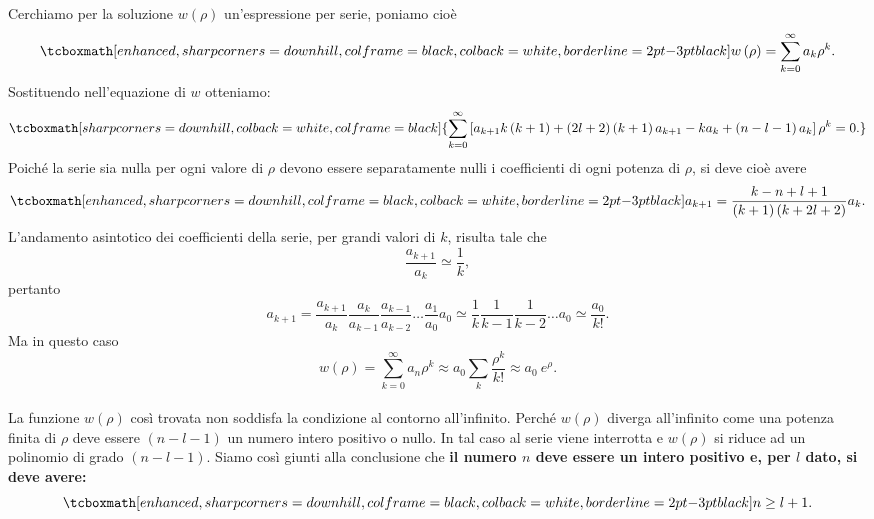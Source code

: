 Cerchiamo per la soluzione $w\left(\rho\right)$ un'espressione per serie, poniamo cioè 
	\begin{equation}
		\tcboxmath[enhanced, sharp corners=downhill, colframe=black, colback=white, borderline={2pt}{-3pt}{black}]{
			w\left(\rho\right)=\sum_{k=0}^\infty a_k \rho^k .
			}
	\end{equation}
Sostituendo nell'equazione di $w$ otteniamo:
	\begin{equation}
		\tcboxmath[sharp corners=downhill, colback=white, colframe=black]{
			\sum_{k=0}^\infty\left[a_{k+1}k\left(k+1\right)+\left(2l+2\right)\left(k+1\right)a_{k+1}-ka_k+\left(n-l-1\right)a_k\right]\rho^k=0 .
			}
	\end{equation}
Poiché la serie sia nulla per ogni valore di $\rho$ devono essere separatamente nulli i coefficienti di ogni potenza di $\rho$, si deve cioè avere
	\begin{equation}
		\tcboxmath[enhanced, sharp corners=downhill, colframe=black, colback=white, borderline={2pt}{-3pt}{black}]{
			a_{k+1}=\frac{k-n+l+1}{\left(k+1\right)\left(k+2l+2\right)}a_k .
			}
	\end{equation}
L'andamento asintotico dei coefficienti della serie, per grandi valori di $k$, risulta tale che
	\begin{equation}
		\frac{a_{k+1}}{a_k}\simeq \frac{1}{k},
	\end{equation}
pertanto
	\begin{equation}
		a_{k+1}=\frac{a_{k+1}}{a_{k}}\frac{a_{k}}{a_{k-1}}\frac{a_{k-1}}{a_{k-2}}\dots \frac{a_{1}}{a_{0}}a_0  \simeq \frac{1}{k} \frac{1}{k-1}\frac{1}{k-2}\dots a_0\simeq \frac{a_0}{k!}  .
	\end{equation}
Ma in questo caso
	\begin{equation}
		w(\rho) =\sum _{k=0} ^{\infty} a_n\rho ^k \approx a_0 \sum _k \frac{\rho ^k}{k!} \approx a_0\ e^{\rho}.
	\end{equation}\\

La funzione $w (\rho )$ così trovata non soddisfa la condizione al contorno all'infinito. Perché $w(\rho )$ diverga all'infinito come una potenza finita di $\rho$ deve essere $(n-l-1)$ un numero intero positivo o nullo. In tal caso al serie viene interrotta e $w (\rho )$ si riduce ad un polinomio di grado $(n-l-1)$. Siamo così giunti alla conclusione che \textbf{il numero $n$ deve essere un intero positivo e, per $l$ dato, si deve avere:}
	\begin{equation}
		\tcboxmath[enhanced, sharp corners=downhill, colframe=black, colback=white, borderline={2pt}{-3pt}{black}]{
			n \geq l+1.
			}
	\end{equation}\\
	
